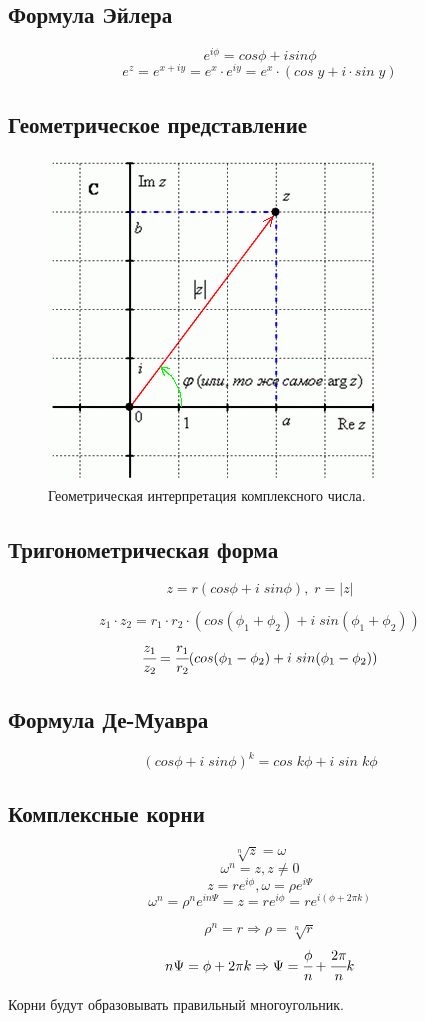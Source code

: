 \documentclass[12pt, paper]{article}
\begin{document}
\subsection{Формула Эйлера}
\begin{tcolorbox}
\[ e^{i\phi} = cos\phi +isin\phi \]
\[ e^z = e^{x+iy} = e^x\cdot e^{iy} = e^x \cdot (cos\; y +i\cdot sin\; y) \]
\end{tcolorbox}

\newpage
\subsection{Геометрическое представление}
\begin{figure}[h]
    \centering
    \includegraphics[width=0.4\linewidth]{images/compl_plane.png}
    \caption{Геометрическая интерпретация комплексного числа.}
    \label{fig:compl_plane}
\end{figure}
\subsection{Тригонометрическая форма}
\begin{tcolorbox}
\[ z = r(cos\phi +i\; sin\phi),\; r=|z| \]
\end{tcolorbox}
\[ z_1\cdot z_2 = r_1\cdot r_2 \cdot (cos(\phi_1+\phi_2) + i\; sin(\phi_1+\phi_2)) \]
\[\cfrac{z_1}{z_2} = \cfrac{r_1}{r_2}(cos(\phi_1-\phi_2) + i\; sin(\phi_1-\phi_2)) \]

\subsection{Формула Де-Муавра}
\begin{tcolorbox}
\[ (cos \phi +i\; sin\phi)^k = cos\; k\phi + i\; sin\; k\phi \]
\end{tcolorbox}

\subsection{Комплексные корни}
\[ \sqrt[n]{z} = \omega \]
\[ \omega^n = z, z \not= 0\]
\[ z = re^{i\phi}, \omega = \rho e^{i\Psi}  \]
\[ \omega^n = \rho^n e^{in\Psi} = z = re^{i\phi} = re^{i(\phi+2\pi k)}\]
\begin{tcolorbox}
\[ \rho^n = r \Rightarrow \rho = \sqrt[n]{r} \]
\[ n\Psi = \phi + 2\pi k \Rightarrow \Psi = \cfrac{\phi}{n} + \cfrac{2\pi}{n}k \]
\end{tcolorbox}
Корни будут образовывать правильный многоугольник.
\end{document}
